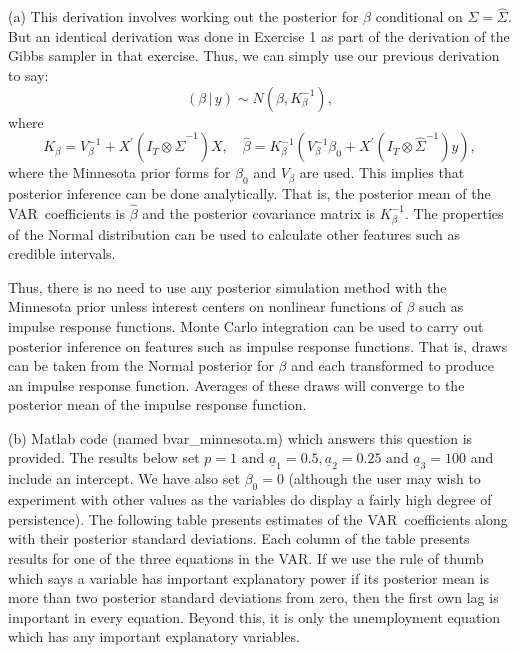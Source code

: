 \documentclass{article}
\begin{document}
(a) This derivation involves working out the posterior for $\beta $
conditional on $\Sigma =\widehat{\Sigma }$. But an identical derivation was
done in Exercise 1 as part of the derivation of the Gibbs sampler in that
exercise. Thus, we can simply use our previous derivation to say: 
\begin{equation*}
(\beta \,|\,y)\sim N(\hat{\beta},K_{\beta }^{-1}),
\end{equation*}%
where 
\begin{equation*}
K_{\beta }=V_{\beta }^{-1}+X^{\prime }(I_{T}\otimes \widehat{\Sigma }%
^{-1})X,\quad \hat{\beta}=K_{\beta }^{-1}\left( V_{\beta }^{-1}\beta
_{0}+X^{\prime }(I_{T}\otimes \widehat{\Sigma }^{-1})y\right) ,
\end{equation*}%
where the Minnesota prior forms for $\beta _{0}$ and $V_{\beta }$ are used.
This implies that posterior inference can be done analytically. That is, the
posterior mean of the VAR\ coefficients is $\hat{\beta}$ and the posterior
covariance matrix is $K_{\beta }^{-1}$. The properties of the Normal
distribution can be used to calculate other features such as credible
intervals.

Thus, there is no need to use any posterior simulation method with the
Minnesota prior unless interest centers on nonlinear functions of $\beta $
such as impulse response functions. Monte Carlo integration can be used to
carry out posterior inference on features such as impulse response
functions. That is, draws can be taken from the Normal posterior for $\beta $
and each transformed to produce an impulse response function. Averages of
these draws will converge to the posterior mean of the impulse response
function.

(b) Matlab code (named bvar\_minnesota.m) which answers this question is
provided. The results below set $p=1$ and $\underline{a}_{1}=0.5,\underline{a%
}_{2}=0.25$ and $\underline{a}_{3}=100$ and include an intercept. We have
also set $\beta _{0}=0$ (although the user may wish to experiment with other
values as the variables do display a fairly high degree of persistence). The
following table presents estimates of the VAR\ coefficients along with their
posterior standard deviations. Each column of the table presents results for
one of the three equations in the VAR. If we use the rule of thumb which
says a variable has important explanatory power if its posterior mean is
more than two posterior standard deviations from zero, then the first own
lag is important in every equation. Beyond this, it is only the unemployment
equation which has any important explanatory variables.
\end{document}
